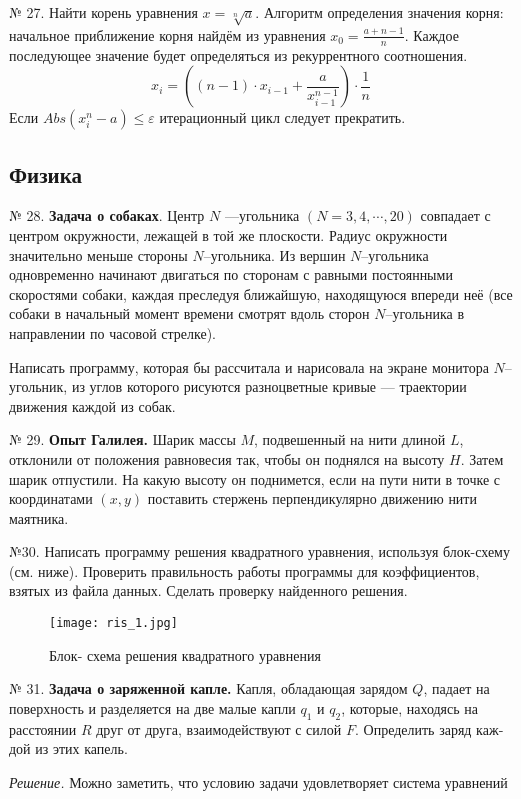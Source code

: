 {№ 27. Найти корень уравнения $x = \sqrt[n]{a}$. Алгоритм опреде­ления значения корня: начальное приближение корня  найдём из уравнения    $x_0 = \frac{a + n -1}{n} $.  Каждое последующее значение будет определяться из рекуррентного соотношения. 
$$x_i = \left((n-1)\cdot x_{i-1} + \frac{a}{x^{n-1}_{i-1}}   \right)\cdot\frac{1}{n}$$
Если $Abs(x^n_{i}-a)\leq\varepsilon$ итерационный цикл следует прекратить. 

\subsection{Физика}

№ 28. {\bf Задача о собаках}.
Центр $N$ ---угольника $(N = 3, 4,\cdots, 20)$ совпадает с центром окружности, лежащей в той же плоскости. Радиус окружности значительно меньше стороны $N$--угольника. Из вершин $N$--угольника одновременно начинают двигаться по сторонам с равными постоянными скоростями собаки, каждая преследуя ближайшую, находящуюся впереди неё (все собаки в начальный момент времени смотрят вдоль сторон $N$--угольника в направлении по часовой стрелке).

Написать программу, которая бы рассчитала и нарисовала на экране монитора $N$--угольник, из углов которого рисуются разноцветные кривые --- траектории движения каждой из собак.

№ 29. {\bf Опыт Галилея.}
Шарик массы $M$, подвешенный на нити длиной $L$, отклонили от положения равновесия так, чтобы он поднялся на высоту $H$. Затем шарик отпустили. На какую высоту он поднимется, если на пути нити в точке с координатами $(x, y)$ поставить стержень перпендикулярно движению нити маятника.

№30. Написать программу решения квадратного уравнения, используя блок-схему (см. ниже). Проверить правильность работы программы для коэффициентов, взятых из файла данных. Сделать проверку найденного решения.

\begin{figure}[!hb]
\centerline{
\texttt{[image: ris\_1.jpg]}}
\caption{Блок- схема решения квадратного уравнения}
\end{figure}

№ 31. {\bf Задача о заряженной капле.}
Капля, обладающая зарядом $Q$, падает на поверхность и раз­деляется на две малые капли $q_1$ и $q_2$, которые, находясь на расстоянии $R$ друг от друга, взаимодействуют с силой $F$. Определить заряд каж­дой из этих капель.

{\it Решение.} Можно заметить, что условию задачи удовлетворяет система уравнений

}
